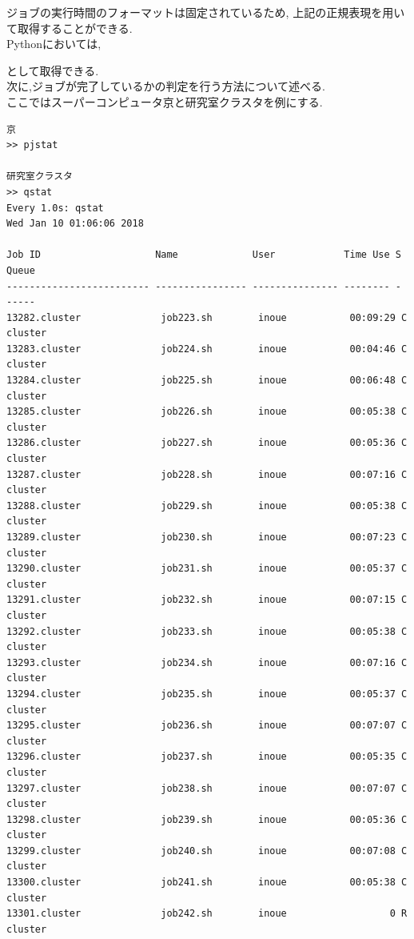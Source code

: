ジョブの実行時間のフォーマットは固定されているため,
上記の正規表現を用いて取得することができる.\\
Pythonにおいては,
{\footnotesize

}
として取得できる.\\
次に,ジョブが完了しているかの判定を行う方法について述べる.\\
ここではスーパーコンピュータ京と研究室クラスタを例にする.\\
{\footnotesize
\begin{lstlisting}[numbers=none]
京
>> pjstat

研究室クラスタ
>> qstat
Every 1.0s: qstat                                                                                                                                            Wed Jan 10 01:06:06 2018

Job ID                    Name             User            Time Use S Queue
------------------------- ---------------- --------------- -------- - -----
13282.cluster              job223.sh        inoue           00:09:29 C cluster
13283.cluster              job224.sh        inoue           00:04:46 C cluster
13284.cluster              job225.sh        inoue           00:06:48 C cluster
13285.cluster              job226.sh        inoue           00:05:38 C cluster
13286.cluster              job227.sh        inoue           00:05:36 C cluster
13287.cluster              job228.sh        inoue           00:07:16 C cluster
13288.cluster              job229.sh        inoue           00:05:38 C cluster
13289.cluster              job230.sh        inoue           00:07:23 C cluster
13290.cluster              job231.sh        inoue           00:05:37 C cluster
13291.cluster              job232.sh        inoue           00:07:15 C cluster
13292.cluster              job233.sh        inoue           00:05:38 C cluster
13293.cluster              job234.sh        inoue           00:07:16 C cluster
13294.cluster              job235.sh        inoue           00:05:37 C cluster
13295.cluster              job236.sh        inoue           00:07:07 C cluster
13296.cluster              job237.sh        inoue           00:05:35 C cluster
13297.cluster              job238.sh        inoue           00:07:07 C cluster
13298.cluster              job239.sh        inoue           00:05:36 C cluster
13299.cluster              job240.sh        inoue           00:07:08 C cluster
13300.cluster              job241.sh        inoue           00:05:38 C cluster
13301.cluster              job242.sh        inoue                  0 R cluster
\end{lstlisting}
}
